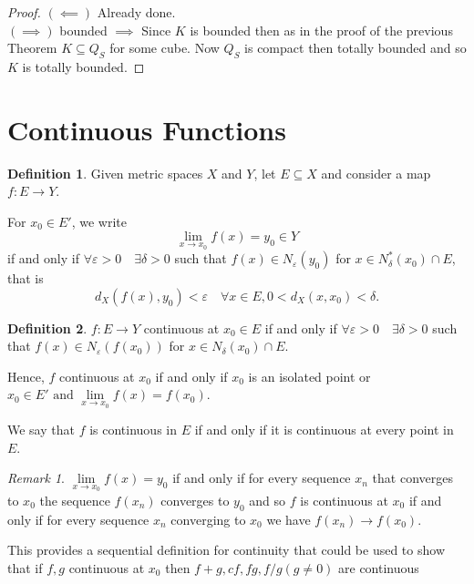 \documentclass[11pt,openany]{book}
\theoremstyle{plain}
\theoremstyle{definition}
\newtheorem{definition}{Definition}[chapter]
\theoremstyle{remark}
\newtheorem{remark}{Remark}[chapter]
\newcommand{\eps}{\varepsilon}
\begin{document}
\begin{proof}
    $(\impliedby)$ Already done.
    \\
    $(\implies)$ bounded $\implies$ Since $K$ is bounded then as in the proof of the previous Theorem $K\subseteq Q_S$ for some cube. Now $Q_S$ is compact then totally bounded and so $K$ is totally bounded.
\end{proof}


\section{Continuous Functions}

\begin{definition}
    Given metric spaces $X$ and $Y$, let $E\subseteq X$ and consider a map $f: E\to Y$.
    
    For $x_0 \in E'$, we write  $$\lim_{x \to x_0}f(x) = y_0 \in Y$$ if and only if $\forall \eps >0 \quad \exists \delta > 0$ such that $f(x) \in N_{\eps}(y_0)$ for $x \in N_{\delta}^*(x_0) \cap E$, that is 
    $$d_X(f(x),y_0)<\eps \quad\forall x\in E, 0<d_X(x,x_0)<\delta.$$
\end{definition}


\begin{definition}
    $f: E \to Y$ continuous at $x_0 \in E$ if and only if $ \forall \eps >0  \quad \exists \delta >0$ such that $f(x) \in N_\eps (f(x_0))$ for $x \in N_{\delta}(x_0) \cap E$.
    
    Hence, $f$ continuous at $x_0$ if and only if $x_0$ is an isolated point or $x_0 \in E' \text{ and } \lim\limits_{x\to x_0} f(x) = f(x_0)$.

    We say that $f$ is continuous in $E$ if and only if it is continuous at every point in $E$.
\end{definition}

\begin{remark}
$\lim\limits _{x\to x_0} f(x) = y_0$ if and only if for every sequence $x_n$ that converges to $x_0$ the sequence $f(x_n)$ converges to $y_0$ and so $f$ is continuous at $x_0$ if and only if for every sequence $x_n$ converging to $x_0$ we have $f(x_n) \to f(x_0)$. 

This provides a sequential definition for continuity that could be used to show that if $f,g$ continuous at $x_0$ then $f+g, cf, fg, f/g (g \ne 0)$ are continuous 
\end{remark} 
\end{document}
